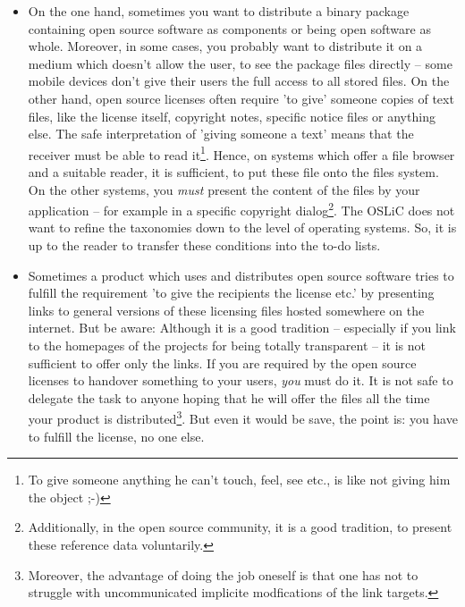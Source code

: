 \label{DistributingFilesHint}
\begin{itemize}
  \item On the one hand, sometimes you want to distribute a bi\-na\-ry package
  containing open source software as components or being open software as whole.
  Moreover, in some cases, you probably want to distribute it on a medium which
  doesn't allow the user, to see the package files directly -- some mobile
  devices don't give their users the full access to all stored files. On the
  other hand, open source licenses often require 'to give' someone copies of
  text files, like the license itself, copyright notes, specific notice files or
  anything else. The safe interpretation of 'giving someone a text' means that
  the receiver must be able to read it\footnote{To give someone anything he
  can't touch, feel, see etc., is like not giving him the object ;-)}. Hence, on
  systems which offer a file browser and a suitable reader, it is sufficient, to
  put these file onto the files system. On the other systems, you \emph{must}
  present the content of the files by your application -- for example in a
  specific copyright dialog\footnote{Additionally, in the open source community,
  it is a good tradition, to present these reference data voluntarily.}. The
  OSLiC does not want to refine the taxonomies down to the level of operating
  systems. So, it is up to the reader to transfer these conditions into the
  to-do lists.
  
  \item Sometimes a product which uses and distributes open source software
  tries to fulfill the requirement 'to give the recipients the license etc.' by
  presenting links to general versions of these licensing files hosted somewhere
  on the internet. But be aware: Although it is a good tradition -- especially
  if you link to the homepages of the projects for being totally transparent --
  it is not sufficient to offer only the links. If you are required by the open
  source licenses to handover something to your users, \emph{you} must do it. It
  is not safe to delegate the task to anyone hoping that he will offer the files
  all the time your product is distributed\footnote{Moreover, the advantage
  of doing the job oneself is that one has not to struggle with uncommunicated
  implicite modfications of the link targets.}. But even it would be save, the
  point is: you have to fulfill the license, no one else.
\end{itemize}

\label{OSUCToDoLists}